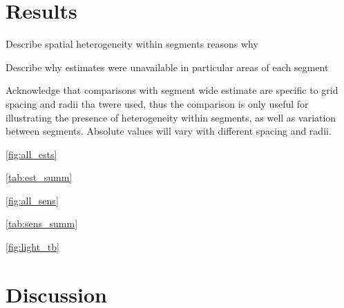 \documentclass[letterpaper,12pt,oneside]{article}\usepackage[]{graphicx}\usepackage[]{color}
\begin{document}
\section{Results}

Describe spatial heterogeneity within segments reasons why

Describe why estimates were unavailable in particular areas of each segment

Acknowledge that comparisons with segment wide estimate are specific to grid spacing and radii tha twere used, thus the comparison is only useful for illustrating the presence of heterogeneity within segments, as well as variation between segments.  Absolute values will vary with different spacing and radii. 

\cref{fig:all_ests}

\cref{tab:est_summ}

\cref{fig:all_sens}

\cref{tab:sens_summ}

\cref{fig:light_tb}

\section{Discussion}



\clearpage
\begin{singlespace}


\end{singlespace}
\clearpage

\end{document}
